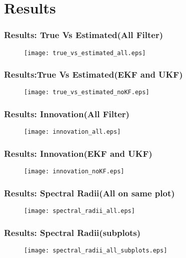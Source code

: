 \documentclass{beamer}
\begin{document}
\section{Results}
\begin{frame}
\frametitle{Results: True Vs Estimated(All Filter)}
\begin{figure}
\texttt{[image: true\_vs\_estimated\_all.eps]}
\end{figure}
\end{frame}
\begin{frame}
\frametitle{Results:True Vs Estimated(EKF and UKF)}

\begin{figure}
\texttt{[image: true\_vs\_estimated\_noKF.eps]}
\end{figure}
\end{frame}
\begin{frame}
\frametitle{Results: Innovation(All Filter)}

\begin{figure}
\texttt{[image: innovation\_all.eps]}
\end{figure}
\end{frame}
\begin{frame}
\frametitle{Results: Innovation(EKF and UKF)}

\begin{figure}
\texttt{[image: innovation\_noKF.eps]}
\end{figure}
\end{frame}
\begin{frame}
\frametitle{Results: Spectral Radii(All on same plot)}
\begin{figure}
\texttt{[image: spectral\_radii\_all.eps]}
\end{figure}
\end{frame}
\begin{frame}
\frametitle{Results: Spectral Radii(subplots)}
\begin{figure}
\texttt{[image: spectral\_radii\_all\_subplots.eps]}
\end{figure}
\end{frame}
\end{document}
